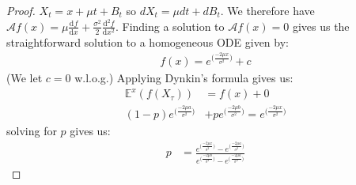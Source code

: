\documentclass[11pt]{article}
\newcommand{\acal}{\mathcal{A}}
\newcommand{\gs}{\sigma}
\newcommand{\mrm}{\mathrm}
\newcommand{\diff}{\mrm{d}}
\newcommand{\deriv}[3][]{%
  \ensuremath{\frac{\diff^{#1} {#2}}{\diff {#3}^{#1}}}}
\newcommand{\E}{\mathbb{E}}
\begin{document}
\begin{enumerate}
\begin{proof}
$X_t = x + \mu t + B_t$ so $dX_t = \mu dt + dB_t$.  We therefore have $\acal f(x) = \mu \deriv{f}{x} + \frac{\gs^2}{2} \deriv[2]{f}{x}$.  Finding a solution to $\acal f(x) = 0$ gives us the straightforward solution to a homogeneous ODE given by:
\begin{align*}
f(x) = e^{\big( \frac{-2 \mu x}{\gs^2}\big)}+c 
\end{align*} (We let $c=0$ w.l.o.g.)
Applying Dynkin's formula gives us:
\begin{align*}
\E^x (f(X_\tau)) &= f(x) + 0 \\
(1-p)e^{\big( \frac{-2 \mu a}{\gs^2}\big)} &+ p e^{\big( \frac{-2 \mu b}{\gs^2}\big)} = e^{\big( \frac{-2 \mu x}{\gs^2}\big)}
\end{align*} solving for $p$ gives us:
\begin{align*}
p & = \frac{e^{\big( \frac{-2 \mu x}{\gs^2}\big)}-e^{\big( \frac{-2 \mu a}{\gs^2}\big)}}{e^{\big( \frac{-2 \mu b}{\gs^2}\big)}-e^{\big( \frac{-2 \mu a}{\gs^2}\big)}}
\end{align*}
\end{proof}
\end{enumerate}
\end{document}
